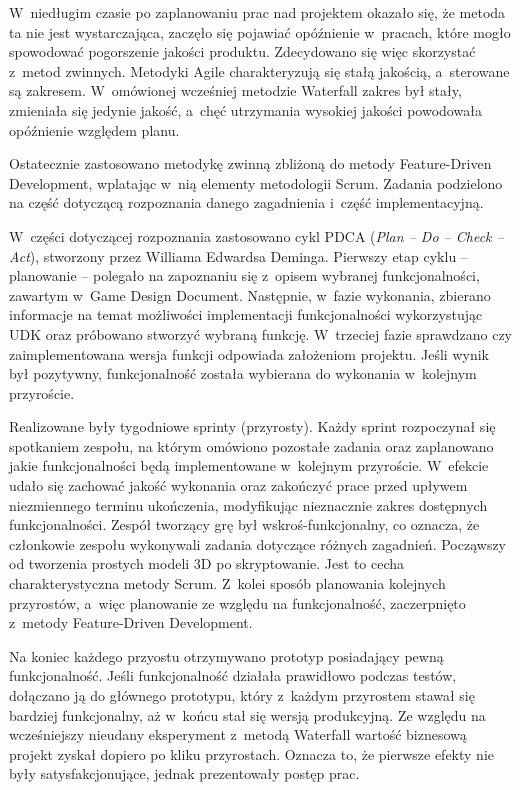 W~niedługim czasie po zaplanowaniu prac nad projektem okazało się, że metoda ta nie jest wystarczająca, zaczęło się pojawiać opóźnienie w~pracach, które mogło spowodować pogorszenie jakości produktu. Zdecydowano się więc skorzystać z~metod zwinnych. Metodyki Agile charakteryzują się stałą jakością, a~sterowane są zakresem. W~omówionej wcześniej metodzie Waterfall zakres był stały, zmieniała się jedynie jakość, a~chęć utrzymania wysokiej jakości powodowała opóźnienie względem planu. 

Ostatecznie zastosowano metodykę zwinną zbliżoną do metody Feature-Driven Development, wplatając w~nią elementy metodologii Scrum. Zadania podzielono na część dotyczącą rozpoznania danego zagadnienia i~część implementacyjną. 

W~części dotyczącej rozpoznania zastosowano cykl PDCA (\emph{Plan -- Do -- Check -- Act}), stworzony przez Williama Edwardsa Deminga. Pierwszy etap cyklu -- planowanie -- polegało na zapoznaniu się z~opisem wybranej funkcjonalności, zawartym w~Game Design Document. Następnie, w~fazie wykonania, zbierano informacje na temat możliwości implementacji funkcjonalności wykorzystując UDK oraz próbowano stworzyć wybraną funkcję. W~trzeciej fazie sprawdzano czy zaimplementowana wersja funkcji odpowiada założeniom projektu. Jeśli wynik był pozytywny, funkcjonalność została wybierana do wykonania w~kolejnym przyroście.

Realizowane były tygodniowe sprinty (przyrosty). Każdy sprint rozpoczynał się spotkaniem zespołu, na którym omówiono pozostałe zadania oraz zaplanowano jakie funkcjonalności będą implementowane w~kolejnym przyroście. W~efekcie udało się zachować jakość wykonania oraz zakończyć prace przed upływem niezmiennego terminu ukończenia, modyfikując nieznacznie zakres dostępnych funkcjonalności. Zespół tworzący grę był wskroś-funkcjonalny, co oznacza, że członkowie zespołu wykonywali zadania dotyczące różnych zagadnień. Począwszy od tworzenia prostych modeli 3D po skryptowanie. Jest to cecha charakterystyczna metody Scrum. Z~kolei sposób planowania kolejnych przyrostów, a~więc planowanie ze względu na funkcjonalność, zaczerpnięto z~metody Feature-Driven Development. 

Na koniec każdego przyostu otrzymywano prototyp posiadający pewną funkcjonalność. Jeśli funkcjonalność działała prawidłowo podczas testów, dołączano ją do głównego prototypu, który z~każdym przyrostem stawał się bardziej funkcjonalny, aż w~końcu stał się wersją produkcyjną. Ze względu na wcześniejszy nieudany eksperyment z~metodą Waterfall wartość biznesową projekt zyskał dopiero po kliku przyrostach. Oznacza to, że pierwsze efekty nie były satysfakcjonujące, jednak prezentowały postęp prac. 

